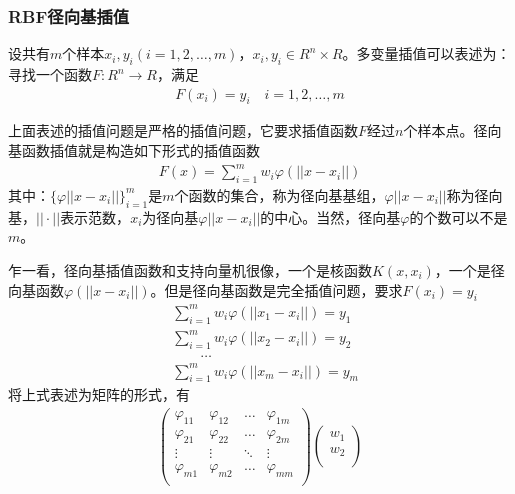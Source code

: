 {        \subsubsection{RBF径向基插值}
            \par
            设共有$m$个样本$x_i,y_i(i=1,2,\dots,m)$，$x_i,y_i\in R^n\times R$。多变量插值可以表述为：寻找一个函数$F:R^n\rightarrow R$，满足
            \begin{align*}
            F(x_i) = y_i \quad i= 1,2,\dots,m
            \end{align*}
            \par
            上面表述的插值问题是严格的插值问题，它要求插值函数$F$经过$n$个样本点。径向基函数插值就是构造如下形式的插值函数
            \begin{align*}
            F(x) = \sum_{i=1}^m w_i \varphi(||x-x_i||)
            \end{align*}
            其中：$\{\varphi ||x-x_i||\}_{i=1}^m$是$m$个函数的集合，称为径向基基组，$\varphi||x-x_i||$称为径向基，$||\cdot||$表示范数，$x_i$为径向基$\varphi||x-x_i||$的中心。当然，径向基$\varphi$的个数可以不是$m$。
            \par
            乍一看，径向基插值函数和支持向量机很像，一个是核函数$K(x,x_i)$，一个是径向基函数$\varphi(||x-x_i||)$。但是径向基函数是完全插值问题，要求$F(x_i) = y_i$
            \begin{align*}
            & \sum_{i=1}^mw_i\varphi(||x_1 -x_i||) = y_1\\
            & \sum_{i=1}^mw_i\varphi(||x_2 -x_i||) = y_2\\
            & \qquad \dots\\
            & \sum_{i=1}^mw_i\varphi(||x_m -x_i||) = y_m
            \end{align*}
            将上式表述为矩阵的形式，有
            \begin{align*}
            \begin{pmatrix}
            \varphi_{11} & \varphi_{12}& \dots & \varphi_{1m} \\
            \varphi_{21} & \varphi_{22}& \dots & \varphi_{2m} \\
            \vdots&\vdots&\ddots&\vdots\\
            \varphi_{m1} & \varphi_{m2}& \dots & \varphi_{mm} \\
            \end{pmatrix}
            \begin{pmatrix}
            w_1\\
            w_2\\

\end{pmatrix}
\end{align*}}
